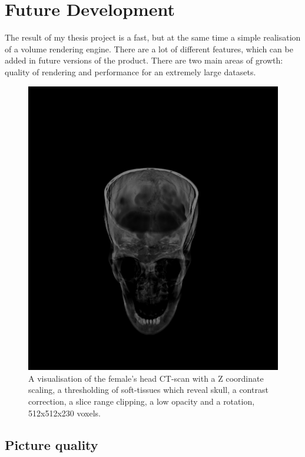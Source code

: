 \documentclass[twoside, english, 11pt]{report}
\begin{document}
\section{Future Development}

The result of my thesis project is a fast, but at the same time a simple realisation of a volume rendering engine. There are a lot of different features, which can be added in future versions of the product. There are two main areas of growth: quality of rendering and performance for an extremely large datasets.\\

\begin{figure}[H]
\centerline{\includegraphics[scale = 0.7]{img/head-all}}
\caption{A visualisation of the female's head CT-scan with a Z coordinate scaling, a thresholding of soft-tissues which reveal skull, a contrast correction, a slice range clipping, a low opacity and a rotation, 512x512x230 voxels.\label{fig:head-all}}
\end{figure}

\subsection{Picture quality}
\end{document}

